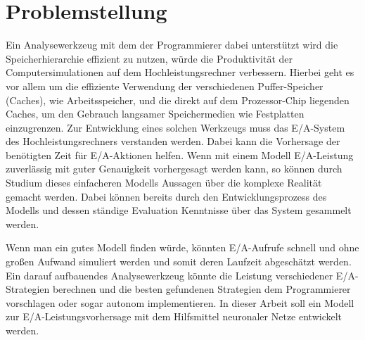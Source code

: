 \documentclass[
	12pt,
	a4paper,
	BCOR10mm,
	DIV14,
	listof=totoc,
	bibliography=totoc,
	headsepline
]{scrreprt}
\begin{document}
\section{Problemstellung}
Ein Analysewerkzeug mit dem der Programmierer dabei unterstützt wird die Speicherhierarchie effizient zu nutzen, würde die Produktivität der Computersimulationen auf dem Hochleistungsrechner verbessern.
Hierbei geht es vor allem um die effiziente Verwendung der verschiedenen Puffer-Speicher (Caches), wie Arbeitsspeicher, und die direkt auf dem Prozessor-Chip liegenden Caches, um den Gebrauch langsamer Speichermedien wie Festplatten einzugrenzen. 
Zur Entwicklung eines solchen Werkzeugs muss das E/A-System des Hochleistungsrechners verstanden werden.
Dabei kann die Vorhersage der benötigten Zeit für E/A-Aktionen helfen. Wenn mit einem Modell E/A-Leistung zuverlässig mit guter Genauigkeit vorhergesagt werden kann, so können durch Studium dieses einfacheren Modells Aussagen über die komplexe Realität gemacht werden.
Dabei können bereits durch den Entwicklungsprozess des Modells und dessen ständige Evaluation Kenntnisse über das System gesammelt werden.
  
Wenn man ein gutes Modell finden würde, könnten E/A-Aufrufe schnell und ohne großen Aufwand simuliert werden und somit deren Laufzeit abgeschätzt werden.
Ein darauf aufbauendes Analysewerkzeug könnte die Leistung verschiedener E/A-Strategien berechnen und die besten gefundenen Strategien dem Programmierer vorschlagen oder sogar autonom implementieren.  
In dieser Arbeit soll ein Modell zur E/A-Leistungsvorhersage mit dem Hilfsmittel neuronaler Netze entwickelt werden. 
\end{document}
